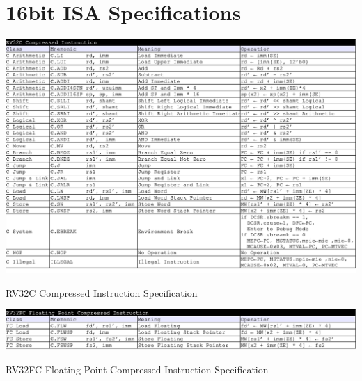\section{16bit ISA Specifications}

\begin{table}[H]
    \includegraphics[width=1.00\columnwidth]{./Table/ISASpec_RV32C.png}
    \caption{RV32C Compressed Instruction Specification}
    \label{tb:ISASpec_RV32C}
\end{table}

\begin{table}[H]
    \includegraphics[width=1.00\columnwidth]{./Table/ISASpec_RV32FC.png}
    \caption{RV32FC Floating Point Compressed Instruction Specification}
    \label{tb:ISASpec_RV32FC}
\end{table}






